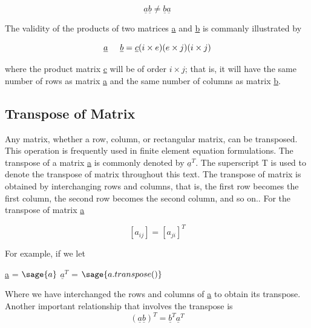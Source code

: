 \documentclass[12pt]{report}
\newcommand{\gen}[1]
{
	[#1_{{ij}}]
}
\begin{document}
\begin{equation}
	\underline{a}\underline{b} \neq \underline{b}\underline{a}
\end{equation}

The validity of the products of two matrices \underline{a} and
\underline{b} is commanly illustrated by

\begin{equation} 
\underline{a} \hspace{0.5cm} \underline{b} = \underline{c} \nonumber \\
(i \times e)(e \times j) (i \times j) \label{eq:genmulti}
\end{equation}

where the product matrix \underline{c} will be of order $i \times j$;
that is, it will have the same number of rows as matrix \underline{a}
and the same number of columns as matrix \underline{b}.


\subsection{Transpose of Matrix}

Any matrix, whether a row, column, or rectangular matrix, can be
transposed. This operation is frequently used in finite element
equation formulations. The transpose of a matrix \underline{a} is
commonly denoted by $\underline{a}^T$. The superscript T is used to
denote the transpose of matrix throughout this text. The transpose of
matrix is obtained by interchanging rows and columns, that is, the
first row becomes the first column, the second row becomes the second
column, and so on.. For the transpose of matrix \underline{a}

\begin{equation}
	\gen{a} =[a_{{ji}}]^T
\end{equation}

For example, if we let
\begin{center}
	\underline{a} = $\sage{a}$
	$\underline{a}^T$ = $\sage{a.transpose()}$
\end{center}

Where we have interchanged the rows and columns of \underline{a} to
obtain its transpose.
Another important relationship that involves the
transpose is
\begin{equation}
	(\underline{a}\underline{b})^T = \underline{b}^T \underline{a}^T
	\label{eq:transpose}
\end{equation}
\end{document}
